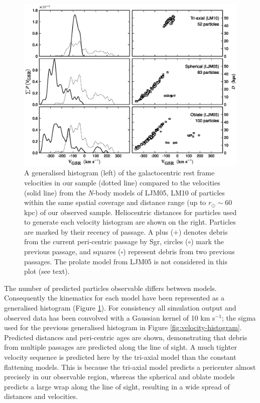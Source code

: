 \documentclass[preprint2]{aastex}
\begin{document}
	\begin{figure}[t!]
		\includegraphics[width=\textwidth]{./sgr_velocities.eps}
		\caption{A generalised histogram (left) of the galactocentric rest frame velocities in our sample (dotted line) compared to the velocities (solid line) from the \textit{N}-body models of LJM05, LM10 of particles within the same spatial coverage and distance range (up to $r_\odot \sim 60$ kpc) of our observed sample. Heliocentric distances for particles used to generate each velocity histogram are shown on the right. Particles are marked by their recency of passage. A plus ($+$) denotes debris from the current peri-centric passage by Sgr, circles ($\circ$) mark the previous passage, and squares ($\square$) represent debris from two previous passages. The prolate model from LJM05 is not considered in this plot (see text).}
		\label{fig:law-vel-compare}
	\end{figure}
	
	The number of predicted particles observable differs between models. Consequently the kinematics for each model have been represented as a generalised histogram (Figure \ref{fig:law-vel-compare}). For consistency all simulation output and observed data has been convolved with a Gaussian kernel of 10 km s$^{-1}$; the sigma used for the previous generalised histogram in Figure \ref{fig:velocity-histogram}. Predicted distances and peri-centric ages are shown, demonstrating that debris from multiple passages are predicted along the line of sight. A much tighter velocity sequence is predicted here by the tri-axial model than the constant flattening models. This is because the tri-axial model predicts a pericenter almost precisely in our observable region, whereas the spherical and oblate models predicts a large wrap along the line of sight, resulting in a wide spread of distances and velocities.
	
\end{document}
